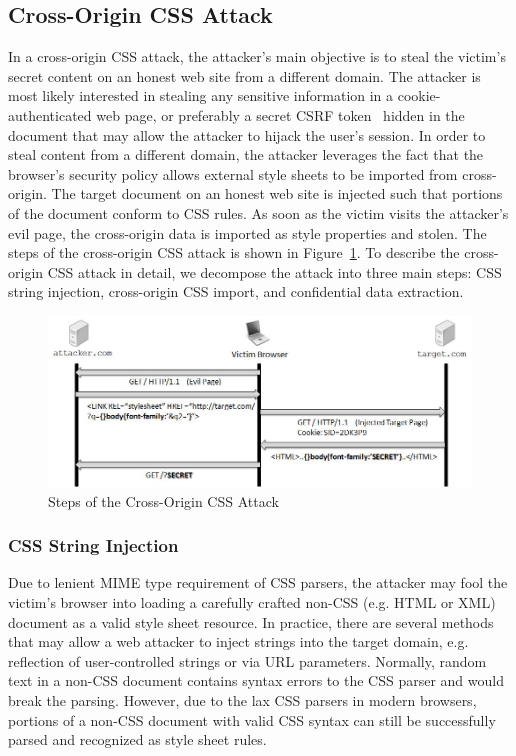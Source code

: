 \documentclass{acm_proc_article-sp}
\begin{document}
\subsection{Cross-Origin CSS Attack}
In a cross-origin CSS attack, the attacker's main objective is to steal the victim's secret content on an honest web site from a different domain. The attacker is most likely interested in stealing any sensitive information in a cookie-authenticated web page, or preferably a secret CSRF token~\cite{csrf} hidden in the document that may allow the attacker to hijack the user's session. In order to steal content from a different domain, the attacker leverages the fact that the browser's security policy allows external style sheets to be imported from cross-origin. The target document on an honest web site is injected such that portions of the document conform to CSS rules. As soon as the victim visits the attacker's evil page, the cross-origin data is imported as style properties and stolen. The steps of the cross-origin CSS attack is shown in Figure~\ref{figure:steps}. To describe the cross-origin CSS attack in detail, we decompose the attack into three main steps: CSS string injection, cross-origin CSS import, and confidential data extraction.

\begin{figure}
\centering
\includegraphics[width=\linewidth]{steps.jpg}
\caption{Steps of the Cross-Origin CSS Attack}
\label{figure:steps}
\end{figure}

\subsubsection{CSS String Injection}
Due to lenient MIME type requirement of CSS parsers, the attacker may fool the victim's browser into loading a carefully crafted non-CSS (e.g. HTML or XML) document as a valid style sheet resource. In practice, there are several methods that may allow a web attacker to inject strings into the target domain, e.g. reflection of user-controlled strings or via URL parameters. Normally, random text in a non-CSS document contains syntax errors to the CSS parser and would break the parsing. However, due to the lax CSS parsers in modern browsers, portions of a non-CSS document with valid CSS syntax can still be successfully parsed and recognized as style sheet rules.
\end{document}
